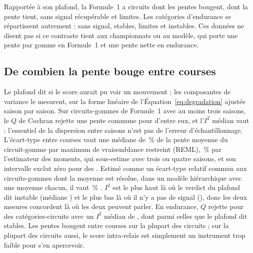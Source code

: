 \documentclass[11pt,a4paper]{article}
\begin{document}
Rapportée à son plafond, la Formule~1 a \NCeilingUnstable{} circuits dont les
pentes bougent, \NCeilingStable{} dont la pente tient, \NCeilingNoSignal{} sans
signal récupérable et \NCeilingBorderline{} limites. Les catégories d'endurance
se répartissent autrement : \EndCeilNoSignal{} sans signal, \EndCeilStable{}
stables, \EndCeilBorderline{} limites et \EndCeilUnstable{} instables. Ces
données ne disent pas si ce contraste tient aux championnats ou au modèle, qui
porte une pente par gomme en Formule~1 et une pente nette en endurance.

\subsection{De combien la pente bouge entre courses}
\label{sec:variance}

Le plafond dit si le score aurait pu voir un mouvement ; les composantes de
variance le mesurent, sur la forme linéaire de l'Équation~\ref{eq:degradation}
ajustée saison par saison. Sur \VarN{} circuits-gommes de Formule~1 avec au
moins trois saisons, le $Q$ de Cochran rejette une pente commune pour \VarHet{}
d'entre eux, et l'$I^2$ médian vaut \VarIsq{} \VarIsqCi{} : l'essentiel de la
dispersion entre saisons n'est pas de l'erreur d'échantillonnage. L'écart-type
entre courses vaut une médiane de \TauPubShareReml{}\,\% \TauPubShareRemlCi{} de
la pente moyenne du circuit-gomme par maximum de vraisemblance restreint (REML),
\VarTauShare{}\,\% par l'estimateur des moments, qui sous-estime avec trois ou
quatre saisons, et son intervalle exclut zéro pour \VarTauExcl{} des \VarN{}.
Estimé comme un écart-type relatif commun aux \TauPubCommonN{} circuits-gommes
dont la moyenne est résolue, dans un modèle hiérarchique avec une moyenne
chacun, il vaut \TauPubCommon{}\,\% \TauPubCommonCi{}. $I^2$ est le plus haut là où le verdict du plafond dit instable (médiane
\VarIsqUnstable{}) et le plus bas là où il n'y a pas de signal
(\VarIsqNoSignal{}), donc les deux mesures concordent là où les deux peuvent
parler. En endurance, $Q$ rejette pour \EndVarHet{} des \EndVarN{}
catégories-circuits avec un $I^2$ médian de \EndVarIsq{}, dont \EndVarIsqStable{}
parmi celles que le plafond dit stables. Les pentes bougent entre courses sur la
plupart des circuits ; sur la plupart des circuits aussi, le score intra-relais est simplement un
instrument trop faible pour s'en apercevoir.
\end{document}

